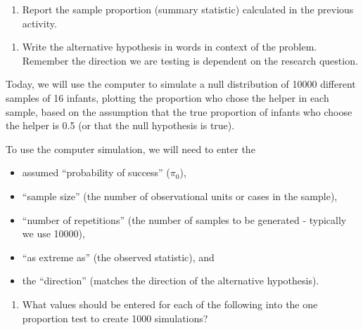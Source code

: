 \documentclass[
]{report}
\providecommand{\tightlist}{%
  \setlength{\itemsep}{0pt}\setlength{\parskip}{0pt}}
\begin{document}
\begin{enumerate}
\def\labelenumi{\arabic{enumi}.}
\tightlist
\item
  Report the sample proportion (summary statistic) calculated in the previous activity.
\end{enumerate}

\vspace{0.3in}

\begin{enumerate}
\def\labelenumi{\arabic{enumi}.}
\setcounter{enumi}{1}
\tightlist
\item
  Write the alternative hypothesis in words in context of the problem. Remember the direction we are testing is dependent on the research question.
\end{enumerate}

\vspace{0.8in}

Today, we will use the computer to simulate a null distribution of 10000 different samples of 16 infants, plotting the proportion who chose the helper in each sample, based on the assumption that the true proportion of infants who choose the helper is 0.5 (or that the null hypothesis is true).

\newpage

To use the computer simulation, we will need to enter the

\begin{itemize}
\tightlist
\item
  assumed ``probability of success'' (\(\pi_0\)),
\item
  ``sample size'' (the number of observational units or cases in the sample),
\item
  ``number of repetitions'' (the number of samples to be generated - typically we use 10000),
\item
  ``as extreme as'' (the observed statistic), and
\item
  the ``direction'' (matches the direction of the alternative hypothesis).
\end{itemize}

\begin{enumerate}
\def\labelenumi{\arabic{enumi}.}
\setcounter{enumi}{2}
\tightlist
\item
  What values should be entered for each of the following into the one proportion test to create 1000 simulations?
\end{enumerate}

\vspace{1mm}
\end{document}
